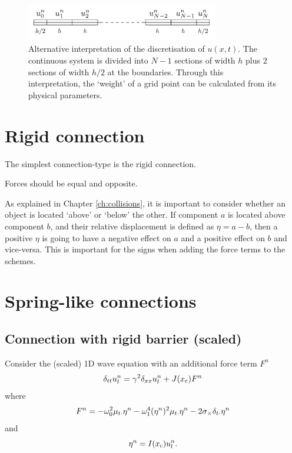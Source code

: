 \begin{figure}[h]
    \centering
    \includegraphics[width=0.75\textwidth]{figures/fdtd/gridFigure2.pdf}
    \caption{Alternative interpretation of the discretisation of $u(x,t)$. The continuous system is divided into $N-1$ sections of width $h$ plus $2$ sections of width $h/2$ at the boundaries. Through this interpretation, the `weight' of a grid point can be calculated from its physical parameters. \label{fig:gridExp2}}
\end{figure}

\section{Rigid connection}
The simplest connection-type is the rigid connection. 

Forces should be equal and opposite. 

As explained in Chapter \ref{ch:collisions}, it is important to consider whether an object is located `above' or `below' the other. If component $a$ is located above component $b$, and their relative displacement is defined as $\eta = a-b$, then a positive $\eta$ is going to have a negative effect on $a$ and a positive effect on $b$ and vice-versa. This is important for the signs when adding the force terms to the schemes. 

\section{Spring-like connections}

\subsection{Connection with rigid barrier (scaled)}
Consider the (scaled) 1D wave equation with an additional force term $F^n$
\begin{equation}\label{eq:1DwaveConnRigid}
    \delta_{tt} u_l^n = \gamma^2\delta_{xx} u_l^n + J(x_{\text{c}})F^n
\end{equation}
where
\begin{equation}\label{eq:1DwaveConnRigidForce}
    F^n = -\omega_0^2\mu_{t\cdot}\eta^n - \omega_1^4(\eta^n)^2\mu_{t\cdot}\eta^n - 2\sigma_\times \delta_{t\cdot} \eta^n
\end{equation}
and
\begin{equation}\label{eq:etaRigid}
    \eta^n = I(x_{\text{c}})u_l^n.
\end{equation}

